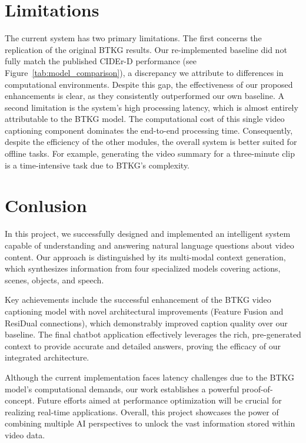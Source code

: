 \section{Limitations}

The current system has two primary limitations. The first concerns the replication of the original BTKG results. Our re-implemented baseline did not fully match the published CIDEr-D performance (see Figure~\ref{tab:model_comparison}), a discrepancy we attribute to differences in computational environments. Despite this gap, the effectiveness of our proposed enhancements is clear, as they consistently outperformed our own baseline. A second limitation is the system's high processing latency, which is almost entirely attributable to the BTKG model. The computational cost of this single video captioning component dominates the end-to-end processing time. Consequently, despite the efficiency of the other modules, the overall system is better suited for offline tasks. For example, generating the video summary for a three-minute clip is a time-intensive task due to BTKG's complexity.



\section{Conlusion}

In this project, we successfully designed and implemented an intelligent system capable of understanding and answering natural language questions about video content. Our approach is distinguished by its multi-modal context generation, which synthesizes information from four specialized models covering actions, scenes, objects, and speech.

Key achievements include the successful enhancement of the BTKG video captioning model with novel architectural improvements (Feature Fusion and ResiDual connections), which demonstrably improved caption quality over our baseline. The final chatbot application effectively leverages the rich, pre-generated context to provide accurate and detailed answers, proving the efficacy of our integrated architecture.

Although the current implementation faces latency challenges due to the BTKG model's computational demands, our work establishes a powerful proof-of-concept. Future efforts aimed at performance optimization will be crucial for realizing real-time applications. Overall, this project showcases the power of combining multiple AI perspectives to unlock the vast information stored within video data.

